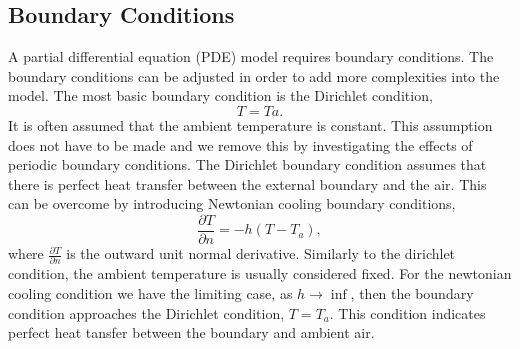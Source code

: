 \subsection{Boundary Conditions}
\label{Sec:models:BC}
A partial differential equation (PDE) model requires boundary conditions. The boundary conditions can be adjusted in order to add more complexities into the model. The most basic boundary condition is the Dirichlet condition,
\begin{equation}
T=Ta. \label{base_BC}
\end{equation}   
It is often assumed that the ambient temperature is constant. This assumption does not have to be made and we remove this by investigating the effects of periodic boundary conditions. The Dirichlet boundary condition assumes that there is perfect heat transfer between the external boundary and the air. This can be overcome by introducing Newtonian cooling boundary conditions,
\begin{equation}
\frac{\partial T}{\partial n}=-h\left(T-T_a\right), \label{Newton_cooling}
\end{equation}
where $\frac{\partial T}{\partial n}$ is the outward unit normal derivative. Similarly to the dirichlet condition, the ambient temperature is usually considered fixed. For the newtonian cooling condition we have the limiting case, as $h\rightarrow \inf$, then the boundary condition approaches the Dirichlet condition, $T=T_a$. This condition indicates perfect heat tansfer between the boundary and ambient air.

